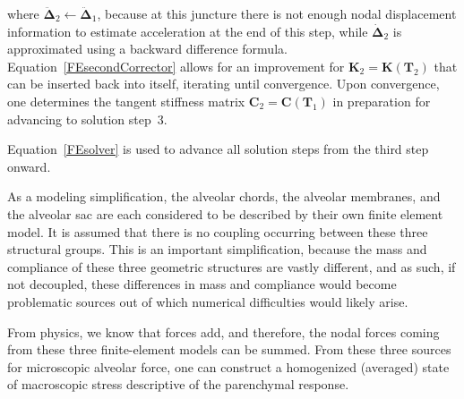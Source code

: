 where $\ddot{\boldsymbol{\Delta}}_2 \leftarrow \ddot{\boldsymbol{\Delta}}_1$, because at this juncture there is not enough nodal displacement information to estimate acceleration at the end of this step, while $\dot{\boldsymbol{\Delta}}_2$ is approximated using a backward difference formula.  Equation~\ref{FEsecondCorrector} allows for an improvement for $\mathbf{K}_2 = \mathbf{K} ( \boldsymbol{T}_2 )$ that can be inserted back into itself, iterating until convergence.  Upon convergence, one determines the tangent stiffness matrix $\mathbf{C}_2 = \mathbf{C} ( \boldsymbol{T}_1 )$ in preparation for advancing to solution step~3. 

Equation~\ref{FEsolver} is used to advance all solution steps from the third step onward.

As a modeling simplification, the alveolar chords, the alveolar membranes, and the alveolar sac are each considered to be described by their own finite element model.  It is assumed that there is no coupling occurring between these three structural groups.  This is an important simplification, because the mass and compliance of these three geometric structures are vastly different, and as such, if not decoupled, these differences in mass and compliance would become problematic sources out of which numerical difficulties would likely arise.

From physics, we know that forces add, and therefore, the nodal forces coming from these three finite-element models can be summed. From these three sources for micro\-scopic alveolar force, one can construct a homo\-genized (averaged) state of macro\-scopic stress descriptive of the parenchymal response.

